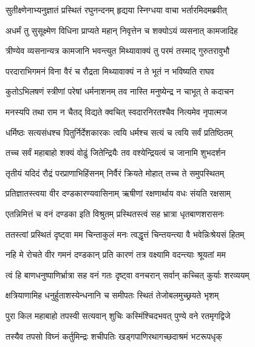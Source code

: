 
\twolineshloka
{सुतीक्ष्णेनाभ्यनुज्ञातं प्रस्थितं रघुनन्दनम्}
{हृद्यया स्निग्धया वाचा भर्तारमिदमब्रवीत्} %

\twolineshloka
{अधर्मं तु सुसूक्ष्मेण विधिना प्राप्यते महान्}
{निवृत्तेन च शक्योऽयं व्यसनात् कामजादिह} %

\twolineshloka
{त्रीण्येव व्यसनान्यत्र कामजानि भवन्त्युत}
{मिथ्यावाक्यं तु परमं तस्माद् गुरुतरावुभौ} %

\twolineshloka
{परदाराभिगमनं विना वैरं च रौद्रता}
{मिथ्यावाक्यं न ते भूतं न भविष्यति राघव} %

\twolineshloka
{कुतोऽभिलषणं स्त्रीणां परेषां धर्मनाशनम्}
{तव नास्ति मनुष्येन्द्र न चाभूत् ते कदाचन} %

\twolineshloka
{मनस्यपि तथा राम न चैतद् विद्यते क्वचित्}
{स्वदारनिरतश्चैव नित्यमेव नृपात्मज} %

\twolineshloka
{धर्मिष्ठः सत्यसंधश्च पितुर्निर्देशकारकः}
{त्वयि धर्मश्च सत्यं च त्वयि सर्वं प्रतिष्ठितम्} %

\twolineshloka
{तच्च सर्वं महाबाहो शक्यं वोढुं जितेन्द्रियैः}
{तव वश्येन्द्रियत्वं च जानामि शुभदर्शन} %

\twolineshloka
{तृतीयं यदिदं रौद्रं परप्राणाभिहिंसनम्}
{निर्वैरं क्रियते मोहात् तच्च ते समुपस्थितम्} %

\twolineshloka
{प्रतिज्ञातस्त्वया वीर दण्डकारण्यवासिनाम्}
{ऋषीणां रक्षणार्थाय वधः संयति रक्षसाम्} %

\twolineshloka
{एतन्निमित्तं च वनं दण्डका इति विश्रुतम्}
{प्रस्थितस्त्वं सह भ्रात्रा धृतबाणशरासनः} %

\twolineshloka
{ततस्त्वां प्रस्थितं दृष्ट्वा मम चिन्ताकुलं मनः}
{त्वद्धृत्तं चिन्तयन्त्या वै भवेन्निःश्रेयसं हितम्} %

\twolineshloka
{नहि मे रोचते वीर गमनं दण्डकान् प्रति}
{कारणं तत्र वक्ष्यामि वदन्त्याः श्रूयतां मम} %

\twolineshloka
{त्वं हि बाणधनुष्पाणिर्भ्रात्रा सह वनं गतः}
{दृष्ट्वा वनचरान् सर्वान् कच्चित् कुर्याः शरव्ययम्} %

\twolineshloka
{क्षत्रियाणामिह धनुर्हुताशस्येन्धनानि च}
{समीपतः स्थितं तेजोबलमुच्छ्रयते भृशम्} %

\twolineshloka
{पुरा किल महाबाहो तपस्वी सत्यवान् शुचिः}
{कस्मिंश्चिदभवत् पुण्ये वने रतमृगद्विजे} %

\twolineshloka
{तस्यैव तपसो विघ्नं कर्तुमिन्द्रः शचीपतिः}
{खड्गपाणिरथागच्छदाश्रमं भटरूपधृक्} %

